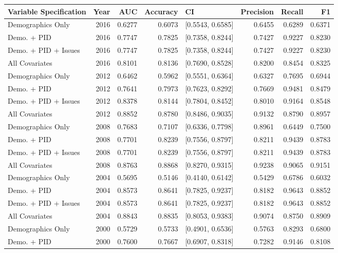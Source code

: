 \begin{longtable}{lrrrlrrr}
  \toprule
Variable Specification & Year & AUC & Accuracy & CI & Precision & Recall & F1 \\ 
  \midrule
Demographics Only & 2016 & 0.6277 & 0.6073 & [0.5543, 0.6585] & 0.6455 & 0.6289 & 0.6371 \\ 
  Demo. + PID & 2016 & 0.7747 & 0.7825 & [0.7358, 0.8244] & 0.7427 & 0.9227 & 0.8230 \\ 
  Demo. + PID + Issues & 2016 & 0.7747 & 0.7825 & [0.7358, 0.8244] & 0.7427 & 0.9227 & 0.8230 \\ 
  All Covariates & 2016 & 0.8101 & 0.8136 & [0.7690, 0.8528] & 0.8200 & 0.8454 & 0.8325 \\ 
  Demographics Only & 2012 & 0.6462 & 0.5962 & [0.5551, 0.6364] & 0.6327 & 0.7695 & 0.6944 \\ 
  Demo. + PID & 2012 & 0.7641 & 0.7973 & [0.7623, 0.8292] & 0.7669 & 0.9481 & 0.8479 \\ 
  Demo. + PID + Issues & 2012 & 0.8378 & 0.8144 & [0.7804, 0.8452] & 0.8010 & 0.9164 & 0.8548 \\ 
  All Covariates & 2012 & 0.8852 & 0.8780 & [0.8486, 0.9035] & 0.9132 & 0.8790 & 0.8957 \\ 
  Demographics Only & 2008 & 0.7683 & 0.7107 & [0.6336, 0.7798] & 0.8961 & 0.6449 & 0.7500 \\ 
  Demo. + PID & 2008 & 0.7701 & 0.8239 & [0.7556, 0.8797] & 0.8211 & 0.9439 & 0.8783 \\ 
  Demo. + PID + Issues & 2008 & 0.7701 & 0.8239 & [0.7556, 0.8797] & 0.8211 & 0.9439 & 0.8783 \\ 
  All Covariates & 2008 & 0.8763 & 0.8868 & [0.8270, 0.9315] & 0.9238 & 0.9065 & 0.9151 \\ 
  Demographics Only & 2004 & 0.5695 & 0.5146 & [0.4140, 0.6142] & 0.5429 & 0.6786 & 0.6032 \\ 
  Demo. + PID & 2004 & 0.8573 & 0.8641 & [0.7825, 0.9237] & 0.8182 & 0.9643 & 0.8852 \\ 
  Demo. + PID + Issues & 2004 & 0.8573 & 0.8641 & [0.7825, 0.9237] & 0.8182 & 0.9643 & 0.8852 \\ 
  All Covariates & 2004 & 0.8843 & 0.8835 & [0.8053, 0.9383] & 0.9074 & 0.8750 & 0.8909 \\ 
  Demographics Only & 2000 & 0.5729 & 0.5733 & [0.4901, 0.6536] & 0.5763 & 0.8293 & 0.6800 \\ 
  Demo. + PID & 2000 & 0.7600 & 0.7667 & [0.6907, 0.8318] & 0.7282 & 0.9146 & 0.8108 \\ 

\end{longtable}
